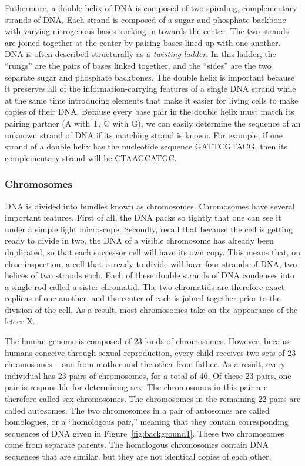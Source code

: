 Futhermore, a double helix of DNA is composed of two spiraling, complementary strands of DNA. 
Each strand is composed of a sugar and phosphate backbone with varying nitrogenous bases sticking in towards the center. 
The two strands are joined together at the center by pairing bases lined up with one another. 
DNA is often described structurally as a \textit{twisting ladder}. 
In this ladder, the “rungs” are the pairs of bases linked together, and the “sides” are the two separate sugar and phosphate backbones.
The double helix is important because it preserves all of the information-carrying features of a single DNA strand 
while at the same time introducing elements that make it easier for living cells to make copies of their DNA. 
Because every base pair in the double helix must match its pairing partner (A with T, C with G), 
we can easily determine the sequence of an unknown strand of DNA if its matching strand is known. 
For example, if one strand of a double helix has the nucleotide sequence GATTCGTACG, then its complementary strand will be CTAAGCATGC.

\subsubsection{Chromosomes} 
DNA is divided into bundles known as chromosomes.
Chromosomes have several important features. 
First of all, the DNA packs so tightly that one can see it under a simple light microscope. 
Secondly, recall that because the cell is getting ready to divide in two, the DNA of a visible chromosome has already been duplicated, so that each successor cell will have its own copy. 
This means that, on close inspection, a cell that is ready to divide will have four strands of DNA, two helices of two strands each. 
Each of these double strands of DNA condenses into a single rod called a sister chromatid. 
The two chromatids are therefore exact replicas of one another, and the center of each is joined together prior to the division of the cell. 
As a result, most chromosomes take on the appearance of the letter X.

The human genome is composed of 23 kinds of chromosomes. 
However, because humans conceive through sexual reproduction, every child receives two sets of 23 chromosomes – one from mother and the other from father. 
As a result, every individual has 23 pairs of chromosomes, for a total of 46. Of these 23 pairs, one pair is responsible for determining sex. 
The chromosomes in this pair are therefore called sex chromosomes. The chromosomes in the remaining 22 pairs are called autosomes.
The two chromosomes in a pair of autosomes are called homologues, or a “homologous pair,” meaning that they contain corresponding sequences of DNA given in Figure~\ref{fig:background1}. 
These two chromosomes come from separate parents. The homologous chromosomes contain DNA sequences that are similar, but they are not identical copies of each other.

